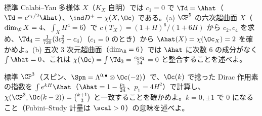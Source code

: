 \begin{prob}{標準}\label{p:CY}
Calabi--Yau 多様体 $X$（$K_X$ 自明）では $c_1=0$ で $\Td=\Ahat$（$\Td=e^{c_1/2}\Ahat$）、$\ind D^+=\chi(X,\Oc)$ である。(a) $\CP^5$ の六次超曲面 $X$（$\dim_{\C}X=4$、$\int_XH^4=6$）で $c(T_X)=(1+H)^6/(1+6H)$ から $c_2,c_4$ を求め、$\Td_4=\frac1{720}(3c_2^2-c_4)$（$c_1=0$ のとき）から $\Ahat(X)=\chi(\Oc_X)=2$ を確かめよ。(b) 五次 3 次元超曲面（$\dim_{\R}=6$）では $\Ahat$ に次数 6 の成分がなく $\int\Ahat=0$、これは $\chi(\Oc)=\int\Td_3=\frac{c_1c_2}{24}=0$ と整合することを述べよ。
\end{prob}
\begin{prob}{標準}\label{p:CP3k}
$\CP^3$（スピン、$\Spn=\Lambda^{0,\bullet}\otimes\Oc(-2)$）で、$\Oc(k)$ で捻った Dirac 作用素の指数を $\int e^{kH}\Ahat$（$\Ahat=1-\frac{p_1}{24}$、$p_1=4H^2$）で計算し、$\chi(\CP^3,\Oc(k-2))=\binom{k+1}3$ と一致することを確かめよ。$k=0,\pm1$ で $0$ になること（Fubini--Study 計量は $\scal>0$）の意味を述べよ。
\end{prob}
